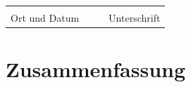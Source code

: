 \documentclass[
    pdftex,
    final,
    11pt,
    a4paper,
    parskip=false, %
    twoside, %
    footheight=0mm, %
    footinclude=false,
    toc=bibliography, %
    toc=listof %
]{scrbook} %
\begin{document}
\begin{appendices}
\begin{otherlanguage}{ngerman}
\vspace{1.5cm}
	
\noindent\begin{tabularx}{\textwidth}{XXXX}
	&&& \\
	\cline{1-1}\cline{4-4}\footnotesize\centering Ort und Datum		&&& \footnotesize\centering Unterschrift
\end{tabularx}
	
\newpage

\chapter{Zusammenfassung}


\lipsum[1-4]

\end{otherlanguage}

\end{appendices}

\backmatter
\end{document}
